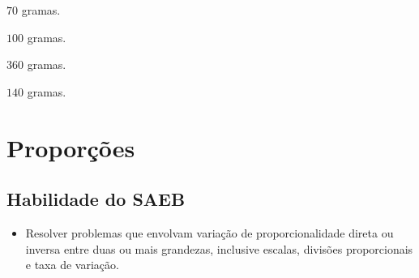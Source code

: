 {{{{\begin{escolha}
\item $70$ gramas.
\item $100$ gramas.
\item $360$ gramas.
\item $140$ gramas.
\end{escolha}



\chapter{Proporções}

\section*{Habilidade do SAEB} 
\begin{itemize}
\item Resolver problemas que envolvam variação de
proporcionalidade direta ou inversa entre duas ou mais grandezas,
inclusive escalas, divisões proporcionais e taxa de variação.
\end{itemize}

}}}}
